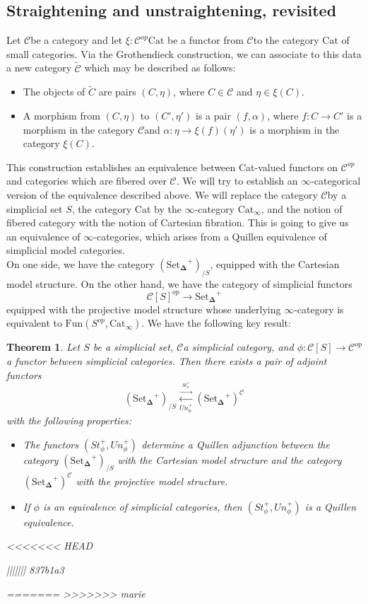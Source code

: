 \documentclass{amsart}
\newcommand{\8}{\ensuremath{\infty}}
\newcommand{\C}{\ensuremath{\mathscr{C}}}
\newcommand{\SSet}{\ensuremath{\text{Set}_{\boldsymbol{\Delta}}}}
\newcommand{\adj}[2]{\ensuremath{\overset{\overset{#1}{\rightarrow}}{\underset{#2}{\leftarrow}}}}
\newtheorem{theorem}{Theorem}
\begin{document}
\subsection{Straightening and unstraightening, revisited}
Let \C be a category and let $\xi:\C^{op}\text{Cat}$ be a functor from \C to the category $\text{Cat}$ of small categories. Via the Grothendieck construction, we can associate to this data a new category $\tilde{\C}$ which may be described as follows:

\begin{itemize}
  \item The objects of $\tilde{C}$ are pairs $(C,\eta)$, where $C\in\C$ and $\eta\in\xi(C)$.
  \item A morphism from $(C,\eta)$ to $(C', \eta')$ is a pair $(f,\alpha)$, where $f:C\rightarrow C'$ is a morphism in the category \C and $\alpha:\eta\rightarrow \xi(f)(\eta')$ is a morphism in the category $\xi(C)$.
\end{itemize}

This construction establishes an equivalence between Cat-valued functors on $\C^{op}$ and categories which are fibered over $\C$. We will try to establish an \8-categorical version of the equivalence described above. We will replace the category \C by a simplicial set $S$, the category Cat by the \8-category $\text{Cat}_{\8}$, and the notion of fibered category with the notion of Cartesian fibration. This is going to give us an equivalence of \8-categories, which arises from a Quillen equivalence of simplicial model categories. \\
On one side, we have the category $(\SSet^+)_{/S}$, equipped with the Cartesian model structure. On the other hand, we have the category of simplicial functors $$\mathscr{C}[S]^{op}\rightarrow \SSet^+$$ equipped with the projective model structure whose underlying \8-category is equivalent to $\text{Fun}(S^{op},\text{Cat}_\8). $ We have the following key result:

\begin{theorem}
  Let $S$ be a simplicial set, \C a simplicial category, and $\phi:\mathscr{C}[S]\rightarrow \C^{op}$ a functor between simplicial categories. Then there exists a pair of adjoint functors
  \[(\SSet^+)_{/S} \adj{St_\phi^+}{Un_\phi^+} (\SSet^+)^\C\]
  with the following properties:
  \begin{itemize}
    \item[(1)] The functors $(St_\phi^+, Un_\phi^+)$ determine a Quillen adjunction between the category $(\SSet^+)_{/S}$ with the Cartesian model structure and the category $(\SSet^+)^\C$ with the projective model structure.
    \item[(2)] If $\phi$ is an equivalence of simplicial categories, then $(St_\phi^+, Un_\phi^+)$ is a Quillen equivalence. 
  \end{itemize}
<<<<<<< HEAD


||||||| 837b1a3

  
=======
>>>>>>> marie
\end{theorem}
\end{document}
